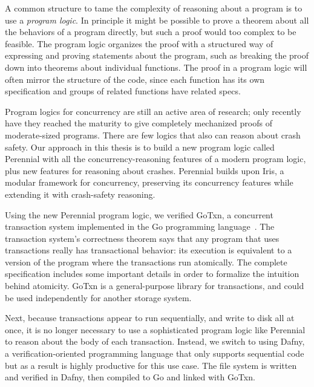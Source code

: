 A common structure to tame the complexity of reasoning about a program is to use
a \emph{program logic}. In principle it might be possible to prove a theorem
about all the behaviors of a program directly, but such a proof would too
complex to be feasible. The program logic organizes the proof with a structured
way of expressing and proving statements about the program, such as breaking the
proof down into theorems about individual functions. The proof in a program
logic will often mirror the structure of the code, since each function has its
own specification and groups of related functions have related specs.

Program logics for concurrency are still an active area of research; only
recently have they reached the maturity to give completely mechanized proofs of
moderate-sized programs. There are few logics that also can reason about crash
safety. Our approach in this thesis is to build a new program logic called Perennial with all the
concurrency-reasoning features of a modern program logic, plus new features for
reasoning about crashes. Perennial builds upon Iris, a modular framework for
concurrency, preserving its concurrency features while extending it with
crash-safety reasoning.

Using the new Perennial program logic, we verified GoTxn, a concurrent
transaction system implemented in the Go programming language~\cite{lang:go}.
The transaction system's correctness theorem says that any program that uses
transactions really has transactional behavior: its execution is equivalent to a
version of the program where the transactions run atomically. The complete
specification includes some important details in order to formalize the
intuition behind atomicity. GoTxn is a general-purpose library for transactions,
and could be used independently for another storage system.

Next, because transactions appear to run sequentially, and write to disk all at
once, it is no longer necessary to use a sophisticated program logic like
Perennial to reason about the body of each transaction. Instead, we switch to
using Dafny, a verification-oriented programming language that only supports
sequential code but as a result is highly productive for this use case. The file
system is written and verified in Dafny, then compiled to Go and linked with
GoTxn.

